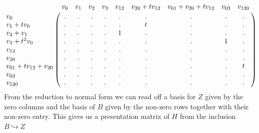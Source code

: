 \begin{example}


    \[
\bordermatrix{
    & v_{0} & v_{1} & v_{2} & v_{3} & v_{12} & v_{20}+tv_{12} & v_{01}+v_{20}+tv_{12} & v_{03} & v_{120}\cr
    v_{0}  &.&.&.&.&.&.&.&.&.\cr
    v_{1}+tv_{0}  &.&.&.&.&.&t&.&.&.\cr
    v_{2}+v_{1}  &.&.&.&.&1&.&.&.&.\cr
    v_{3}+t^{2}v_{0}  &.&.&.&.&.&.&.&1&.\cr
    v_{12} &.&.&.&.&.&.&.&.&.\cr
    v_{20} &.&.&.&.&.&.&.&.&.\cr
    v_{01}+tv_{12}+v_{20} &.&.&.&.&.&.&.&.&t\cr
    v_{03} &.&.&.&.&.&.&.&.&.\cr
    v_{120}&.&.&.&.&.&.&.&.&.
    }
  \]
  From the reduction to normal form we can read off a basis for $Z$ given by the zero columns and the basis of $B$ given by the non-zero rows together with their non-zero entry. This gives us a presentation matrix of $H$ from the inclusion $B \hookrightarrow Z$


\end{example}
